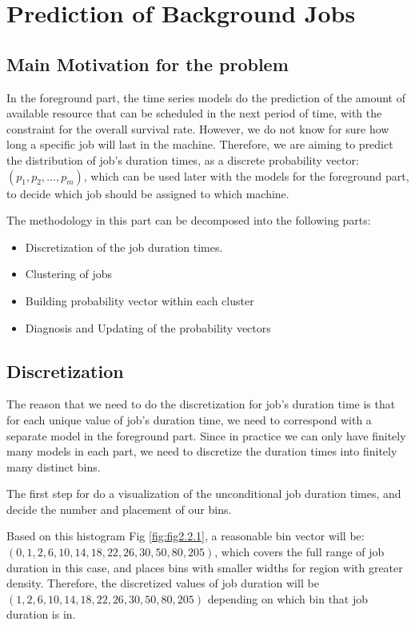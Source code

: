 \documentclass{article}
\begin{document}
\section{Prediction of Background Jobs}
\subsection{Main Motivation for the problem}

\begin{flushleft}
In the foreground part, the time series models do the prediction of the amount
of available resource that can be scheduled in the next period of time, with the
constraint for the overall survival rate. However, we do not know for sure how
long a specific job will last in the machine. Therefore, we are aiming to
predict the distribution of job's duration times, as a discrete probability
vector: $(p_1, p_2, ..., p_m)$, which can be used later with the models for the
foreground part, to decide which job should be assigned to which machine.
\end{flushleft}

\begin{flushleft}
The methodology in this part can be decomposed into the following parts:
\begin{itemize}
    \item Discretization of the job duration times.
    \item Clustering of jobs
    \item Building probability vector within each cluster
    \item Diagnosis and Updating of the probability vectors
\end{itemize}
\end{flushleft}

\subsection{Discretization}

\begin{flushleft}
The reason that we need to do the discretization for job's duration time is that
for each unique value of job's duration time, we need to correspond with a
separate model in the foreground part. Since in practice we can only have
finitely many models in each part, we need to discretize the duration times into
finitely many distinct bins.

The first step for do a visualization of the unconditional job duration times,
and decide the number and placement of our bins.

Based on this histogram Fig \ref{fig:fig2.2.1}, a reasonable bin vector will
be:\newline $(0,1,2,6,10,14,18,22,26,30,50,80,205)$, which covers the full range
of job duration in this case, and places bins with smaller widths for region
with greater density. Therefore, the discretized values of job duration will
be\newline $(1,2,6,10,14,18,22,26,30,50,80,205)$ depending on which bin that job
duration is in.
\end{flushleft}
\end{document}

